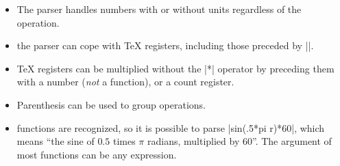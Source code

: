 \begin{command}{\pgfmathparse{}}
\begin{itemize}
  \item The parser handles numbers with or without units regardless
    of the operation.

\begin{codeexample}[post=\tt\footnotesize\pgfmathresult]
\end{codeexample}

  \item the parser can cope with \TeX{} registers, including those 
    preceded by |\the|.

    \makeatletter

\begin{codeexample}[post=\tt\footnotesize\pgfmathresult]
\pgf@x=12.34pt
\end{codeexample}

\begin{codeexample}[post=\tt\footnotesize\pgfmathresult]
\pgf@x=56.78pt
\pgfmathparse{\pgf@x+\the\pgf@x}
\end{codeexample}

  \item \TeX{} registers can be multiplied without the |*| operator
    by preceding them with a number (\emph{not} a function), or a
    count register.
	 
\begin{codeexample}[post=\tt\footnotesize\pgfmathresult]
\pgf@x=10pt
%
\end{codeexample}

  \item Parenthesis can be used to group operations.

\begin{codeexample}[post=\tt\footnotesize\pgfmathresult]
\end{codeexample}

  \item functions are recognized, so it is possible to parse
    |sin(.5*pi r)*60|, which means ``the sine of $0.5$ times $\pi$ 
    radians, multiplied by 60''. The argument of most functions can
    be any expression.

\begin{codeexample}[post=\tt\footnotesize\pgfmathresult]
\end{codeexample}

  \end{itemize}
\end{command}

